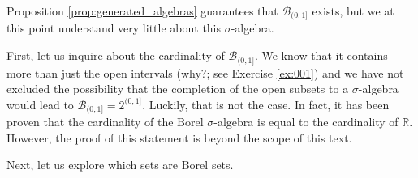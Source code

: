 \documentclass{book}
\theoremstyle{plain}%
\theoremstyle{definition}
\begin{document}
Proposition \ref{prop:generated_algebras} guarantees that $\mathcal{B}_{(0,1]}$ exists, but we at this point understand very little about this $\sigma$-algebra.

First, let us inquire about the cardinality of $\mathcal{B}_{(0,1]}$. We know that it contains more than just the open intervals (why?; see Exercise \ref{ex:001}) and we have not excluded the possibility that the completion of the open subsets to a $\sigma$-algebra would lead to $\mathcal{B}_{(0,1]} = 2^{(0,1]}$. Luckily, that is not the case. In fact, it has been proven that the cardinality of the Borel $\sigma$-algebra is equal to the cardinality of $\mathbb{R}$. However, the proof of this statement is beyond the scope of this text.

Next, let us explore which sets are Borel sets.
\end{document}
